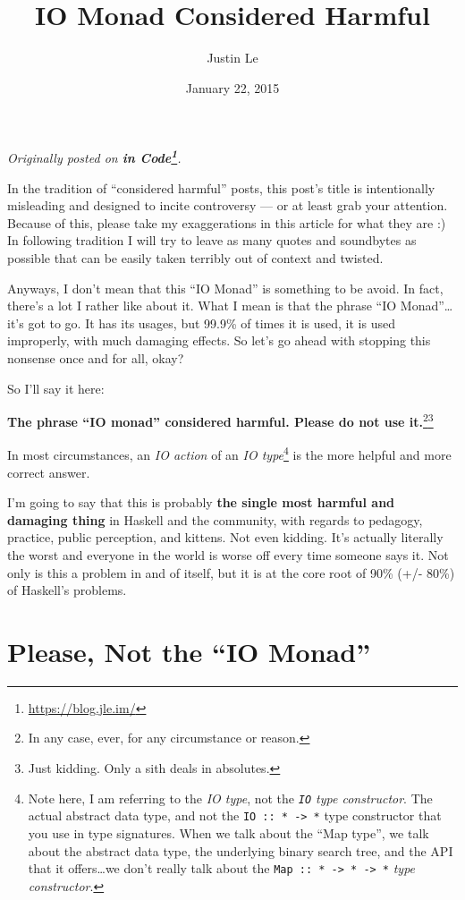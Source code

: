 \documentclass[]{article}
\title{IO Monad Considered Harmful}
\author{Justin Le}
\date{January 22, 2015}
\renewcommand{\href}[2]{#2\footnote{\url{#1}}}
\begin{document}
\maketitle

\emph{Originally posted on \textbf{\href{https://blog.jle.im/}{in
Code}}.}

In the tradition of ``considered harmful'' posts, this post's title is
intentionally misleading and designed to incite controversy --- or at
least grab your attention. Because of this, please take my exaggerations
in this article for what they are :) In following tradition I will try
to leave as many quotes and soundbytes as possible that can be easily
taken terribly out of context and twisted.

Anyways, I don't mean that this ``IO Monad'' is something to be avoid.
In fact, there's a lot I rather like about it. What I mean is that the
phrase ``IO Monad''\ldots{}it's got to go. It has its usages, but 99.9\%
of times it is used, it is used improperly, with much damaging effects.
So let's go ahead with stopping this nonsense once and for all, okay?

So I'll say it here:

\textbf{The phrase ``IO monad'' considered harmful. Please do not use
it.}\footnote{In any case, ever, for any circumstance or reason.}\footnote{Just
  kidding. Only a sith deals in absolutes.}

In most circumstances, an \emph{IO action} of an \emph{IO
type}\footnote{Note here, I am referring to the \emph{IO type}, not the
  \emph{\texttt{IO} type constructor}. The actual abstract data type,
  and not the \texttt{IO\ ::\ *\ -\textgreater{}\ *} type constructor
  that you use in type signatures. When we talk about the ``Map type'',
  we talk about the abstract data type, the underlying binary search
  tree, and the API that it offers\ldots{}we don't really talk about the
  \texttt{Map\ ::\ *\ -\textgreater{}\ *\ -\textgreater{}\ *} \emph{type
  constructor}.} is the more helpful and more correct answer.

I'm going to say that this is probably \textbf{the single most harmful
and damaging thing} in Haskell and the community, with regards to
pedagogy, practice, public perception, and kittens. Not even kidding.
It's actually literally the worst and everyone in the world is worse off
every time someone says it. Not only is this a problem in and of itself,
but it is at the core root of 90\% (+/- 80\%) of Haskell's problems.

\section{\texorpdfstring{Please, Not the ``IO
Monad''}{Please, Not the IO Monad}}\label{please-not-the-io-monad}
\end{document}
